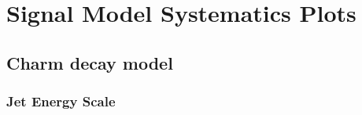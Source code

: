 \chapter{Signal Model Systematics Plots}
\label{ch:app_sig_syst}

\section*{Charm decay model}
\label{sec:t2cc_syst_plots}

\newpage
\subsection*{Jet Energy Scale}
\label{sec:t2cc_jes_plots}

